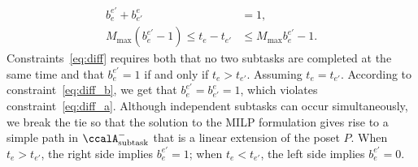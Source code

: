 \documentclass[Afour,sageh,times]{sagej}
\newcommand{\auto}[1]{\ccalA_{\textup{#1}}}
\newcounter{phase} \setcounter{phase}{0}
\newcounter{subphase}[phase] \setcounter{subphase}{0}
\begin{document}
{{{{{\label{activation:b}
\begin{subequations}\label{eq:diff}
  \begin{align}
    b_e^{e'} + b_{e'}^e &  = 1, \label{eq:diff_a}\\
  M_{\text{max}} (b_{e}^{e'} - 1) \leq t_e -  t_{e'} & \leq M_{\text{max}} b_{e}^{e'} - 1. \label{eq:diff_b}
\end{align}
\end{subequations}
Constraints~\eqref{eq:diff} requires both that  no two subtasks are completed at the same time and that $b_e^{e'}=1$ if and only if $t_e > t_{e'}$. Assuming $t_e = t_{e'}$. According to constraint~\eqref{eq:diff_b}, we get that $b_e^{e'}=b_{e'}^{e}=1$, which violates constraint~\eqref{eq:diff_a}. Although independent subtasks can occur simultaneously, we break the tie so that the solution to the MILP formulation gives rise to a simple path in $\auto{subtask}^-$ that is a linear extension of the poset $P$. When $t_e > t_{e'}$, the right side implies $b_e^{e'}=1$; when $t_e < t_{e'}$, the left side implies $b_{e}^{e'}=0$.



}}}}}
\end{document}
